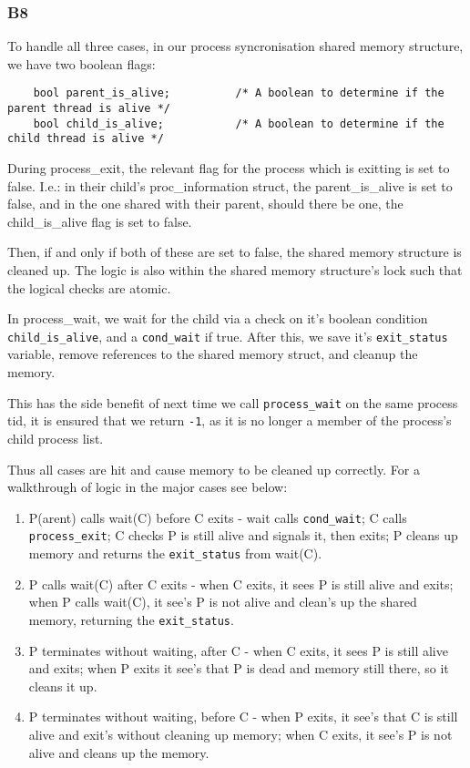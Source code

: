 \documentclass[a4wide, 11pt]{article}
\begin{document}
\subsubsection{B8}

To handle all three cases, in our process syncronisation shared memory structure, we have two boolean flags:

\begin{verbatim}
    bool parent_is_alive;          /* A boolean to determine if the parent thread is alive */
    bool child_is_alive;           /* A boolean to determine if the child thread is alive */
\end{verbatim}

During process\_exit, the relevant flag for the process which is exitting is set to false. I.e.: in their child's proc\_information struct, the parent_is_alive is set to false, and in the one shared with their parent, should there be one, the child\_is\_alive flag is set to false.

Then, if and only if both of these are set to false, the shared memory structure is cleaned up. The logic is also within the shared memory structure's lock such that the logical checks are atomic.

In process\_wait, we wait for the child via a check on it's boolean condition \texttt{child\_is\_alive}, and a \texttt{cond\_wait} if true. After this, we save it's \texttt{exit\_status} variable, remove references to the shared memory struct, and cleanup the memory.

This has the side benefit of next time we call \texttt{process\_wait} on the same process tid, it is ensured that we return \texttt{-1}, as it is no longer a member of the process's child process list.

Thus all cases are hit and cause memory to be cleaned up correctly. For a walkthrough of logic in the major cases see below:

\begin{enumerate}
\item P(arent) calls wait(C) before C exits - wait calls \texttt{cond\_wait}; C calls \texttt{process\_exit}; C checks P is still alive and signals it, then exits; P cleans up memory and returns the \texttt{exit\_status} from wait(C).
\item P calls wait(C) after C exits - when C exits, it sees P is still alive and exits; when P calls wait(C), it see's P is not alive and clean's up the shared memory, returning the \texttt{exit\_status}.
\item P terminates without waiting, after C - when C exits, it sees P is still alive and exits; when P exits it see's that P is dead and memory still there, so it cleans it up.
\item P terminates without waiting, before C - when P exits, it see's that C is still alive and exit's without cleaning up memory; when C exits, it see's P is not alive and cleans up the memory.
\end{enumerate}
\end{document}
